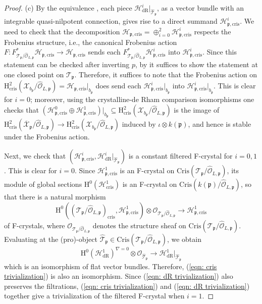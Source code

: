 \documentclass[letter, 11pt]{article}
\theoremstyle{plain}
\theoremstyle{definition}
\newcommand\tensor{{\otimes}}
\newcommand{\<}{\langle}
\renewcommand{\>}{\rangle}
\newcommand{\fp}{\mathfrak{p}}
\newcommand{\sH}{\mathcal{H}}
\newcommand{\sX}{\mathcal{X}}
\newcommand{\sT}{\mathcal{T}}
\newcommand{\sO}{\mathcal{O}}
\renewcommand{\H}{\mathrm{H}}
\newcommand{\dR}{\mathrm{dR}}
\newcommand{\cris}{\mathrm{cris}}
\newcommand{\Cris}{\mathrm{Cris}}
\begin{document}
\begin{proof}
    (c) By the equivalence \cite[Cor.~6.8]{NO}, each piece $\sH^i_\dR|_{\hat{\sT}_\fp}$, as a vector bundle with an integrable quasi-nilpotent connection, gives rise to a direct summand $\sH^i_{\fp, \cris}$. We need to check that the decomposition $\sH_{\fp, \cris} = \oplus_{i = 0}^2 \sH^i_{\fp, \cris}$ respects the Frobenius structure, i.e., the canonical Frobenius action $F : F_{\sT_\fp/ \hat{\sO}_{L,  \fp}}^* \sH_{\fp, \cris} \to \sH_{\fp, \cris}$ sends each $F_{\sT_\fp/ \hat{\sO}_{L,  \fp}}^* \sH^i_{\fp, \cris}$ into $\sH^i_{\fp, \cris}$. Since this statement can be checked after inverting $p$, by \cite[Thm~4.1]{OgusDuke} it suffices to show the statement at one closed point on $\sT_\fp$. Therefore, it suffices to note that the Frobenius action on $\H^2_\cris(\sX_{b_\fp} / \hat{\sO}_{L, \fp}) = \sH_{\fp, \cris}|_{b_\fp}$ does send each $\sH^i_{\fp, \cris}|_{b_\fp}$ into $\sH^i_{\fp, \cris}|_{b_\fp}$. This is clear for $i = 0$; moreover, using the crystalline-de Rham comparison isomorphisms one checks that $(\sH^0_{\fp, \cris} \oplus \sH^1_{\fp, \cris})|_{b_\fp} \subseteq \H^2_\cris(\sX_{b_\fp} / \hat{\sO}_{L, \fp})$ is the image of $\H^2_\cris(\overline{\sX}_\fp / \hat{\sO}_{L, \fp}) \to \H^2_\cris(\sX_{b_\fp}/\hat{\sO}_{L, \fp})$ induced by $\iota \tensor k(\fp)$, and hence is stable under the Frobenius action. 

    Next, we check that $(\sH^i_{\fp, \cris}, \sH^i_\dR|_{\hat{\sT}_\fp})$ is a constant filtered F-crystal for $i = 0, 1$. This is clear for $i = 0$. Since $\sH^1_{\fp, \cris}$ is an F-crystal on $\Cris(\sT_\fp/\hat{\sO}_{L, \fp})$, its module of global sections $\H^0(\sH^1_\cris)$ is an F-crystal on $\Cris(k(\fp)/\hat{\sO}_{L, \fp})$, so that there is a natural morphism 
    \begin{equation}
    \label{eqn: cris trivialization}
        \H^0((\sT_\fp/\hat{\sO}_{L, \fp})_\cris, \sH^1_{\fp, \cris}) \tensor \sO_{\sT_\fp / \hat{\sO}_{L, \fp}} \to \sH^1_{\fp, \cris}
    \end{equation} of F-crystals, where $\sO_{\sT_\fp / \hat{\sO}_{L, \fp}}$ denotes the structure sheaf on $\Cris(\sT_\fp / \hat{\sO}_{L, \fp})$. Evaluating at the (pro)-object $\hat{\sT}_\fp \in \Cris(\sT_\fp/ \hat{\sO}_{L, \fp})$, we obtain
    \begin{equation}
        \label{eqn: dR trivialization}
        \H^0(\sH^1_{\dR})^{\nabla = 0} \tensor \sO_{\hat{\sT}_\fp} \to \sH^1_\dR |_{\hat{\sT}_\fp}
    \end{equation}
    which is an isomorphism of flat vector bundles. Therefore, (\ref{eqn: cris trivialization}) is also an isomorphism. Since (\ref{eqn: dR trivialization}) also preserves the filtrations, (\ref{eqn: cris trivialization}) and (\ref{eqn: dR trivialization}) together give a trivialization of the filtered F-crystal when $i = 1$.


\end{proof}
\end{document}
